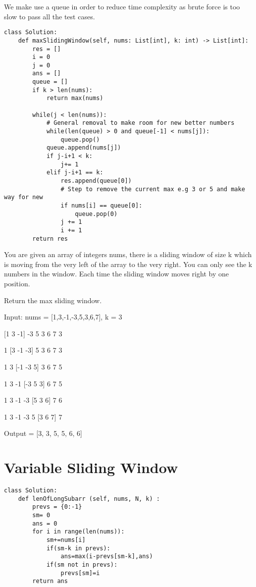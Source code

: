 \documentclass[a4]{article}
\begin{document}
We make use a queue in order to reduce time complexity as brute force is too slow to pass all the test cases.

\begin{lstlisting}
class Solution:
    def maxSlidingWindow(self, nums: List[int], k: int) -> List[int]:
        res = []
        i = 0
        j = 0
        ans = []
        queue = []
        if k > len(nums):
            return max(nums)
        
        while(j < len(nums)):
            # General removal to make room for new better numbers
            while(len(queue) > 0 and queue[-1] < nums[j]):
                queue.pop()
            queue.append(nums[j])
            if j-i+1 < k:
                j+= 1
            elif j-i+1 == k:
                res.append(queue[0])
                # Step to remove the current max e.g 3 or 5 and make way for new
                if nums[i] == queue[0]:
                    queue.pop(0)
                j += 1
                i += 1  
        return res
\end{lstlisting}

You are given an array of integers nums, there is a sliding window of size k which is moving from the very left of the array to the very right. You can only see the k numbers in the window. Each time the sliding window moves right by one position.

Return the max sliding window.

Input: nums = [1,3,-1,-3,5,3,6,7], k = 3

[1  3  -1] -3  5  3  6  7       3

 1 [3  -1  -3] 5  3  6  7       3

 1  3 [-1  -3  5] 3  6  7       5

 1  3  -1 [-3  5  3] 6  7       5

 1  3  -1  -3 [5  3  6] 7       6

 1  3  -1  -3  5 [3  6  7]      7

 Output = [3, 3, 5, 5, 6, 6]

 \newpage
 \section{Variable Sliding Window}
\begin{lstlisting}
class Solution:
    def lenOfLongSubarr (self, nums, N, k) : 
        prevs = {0:-1}
        sm= 0
        ans = 0
        for i in range(len(nums)):
            sm+=nums[i]
            if(sm-k in prevs):
                ans=max(i-prevs[sm-k],ans)
            if(sm not in prevs):
                prevs[sm]=i
        return ans
\end{lstlisting}
\end{document}
